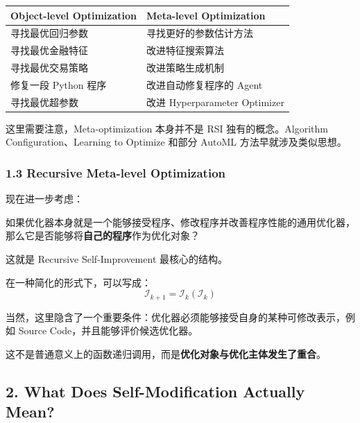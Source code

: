 \begin{readertable}
\begin{longtable}[]{@{}
  >{\raggedright\arraybackslash}p{}
  >{\raggedright\arraybackslash}p{}@{}}
\toprule
Object-level Optimization & Meta-level Optimization \\
\midrule
\endhead
寻找最优回归参数 & 寻找更好的参数估计方法 \\
寻找最优金融特征 & 改进特征搜索算法 \\
寻找最优交易策略 & 改进策略生成机制 \\
修复一段 Python 程序 & 改进自动修复程序的 Agent \\
寻找最优超参数 & 改进 Hyperparameter Optimizer \\
\bottomrule
\end{longtable}
\end{readertable}

这里需要注意，Meta-optimization 本身并不是 RSI 独有的概念。Algorithm Configuration、Learning to Optimize 和部分 AutoML 方法早就涉及类似思想。

\hypertarget{part-3-37-0001-recursive-meta-level-optimization}{%
\subsubsection{1.3 Recursive Meta-level Optimization}\label{part-3-37-0001-recursive-meta-level-optimization}}

现在进一步考虑：

如果优化器本身就是一个能够接受程序、修改程序并改善程序性能的通用优化器，那么它是否能够将\textbf{自己的程序}作为优化对象？


这就是 Recursive Self-Improvement 最核心的结构。

在一种简化的形式下，可以写成：
\[\boxed{
\mathcal I_{k+1}
=
\mathcal I_k(\mathcal I_k)
}\]

当然，这里隐含了一个重要条件：优化器必须能够接受自身的某种可修改表示，例如 Source Code，并且能够评价候选优化器。

这不是普通意义上的函数递归调用，而是\textbf{优化对象与优化主体发生了重合}。

\hypertarget{part-3-37-0001-what-does-self-modification-actually-mean}{%
\subsection{2. What Does Self-Modification Actually Mean?}\label{part-3-37-0001-what-does-self-modification-actually-mean}}

